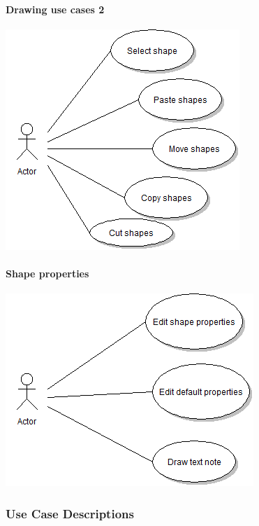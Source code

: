 \documentclass[twoside,letterpaper]{article}
\begin{document}
{\paragraph*{Drawing use cases 2}
\includegraphics[scale=0.6]{../UMLdiagrams/draw2.png}
\paragraph*{Shape properties}
\includegraphics[scale=0.6]{../UMLdiagrams/properties.png}

\bigskip

\subsubsection{Use Case Descriptions}

}
\end{document}
